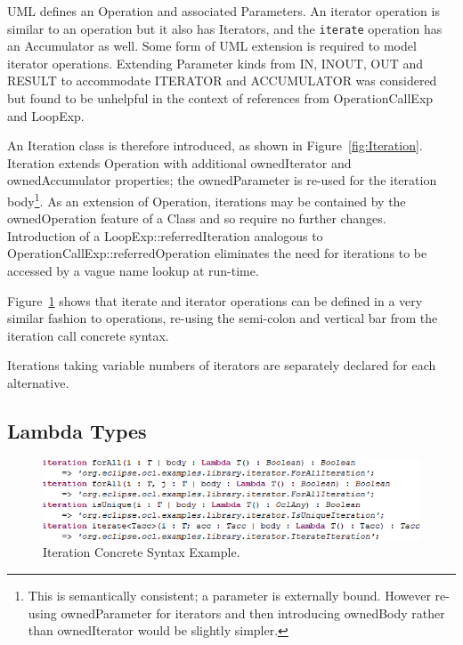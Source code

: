 \documentclass{eceasst}
\begin{document}
UML defines an Operation and associated Parameters. An iterator operation is similar to an operation but it also has Iterators, and the \verb|iterate| operation has an Accumulator as well. Some form of UML extension is required to model iterator operations. Extending Parameter kinds from  IN, INOUT, OUT and RESULT to accommodate ITERATOR and ACCUMULATOR was considered but found to be unhelpful in the context of references from OperationCallExp and LoopExp.

An Iteration class is therefore introduced, as shown in Figure~\ref{fig:Iteration}. Iteration extends Operation with additional ownedIterator and ownedAccumulator properties; the ownedParameter is re-used for the iteration body\footnote{This is semantically consistent; a parameter is externally bound. However re-using ownedParameter for iterators and then introducing ownedBody rather than ownedIterator would be slightly simpler.}. As an extension of Operation, iterations may be contained by the ownedOperation feature of a Class and so require no further changes. Introduction of a LoopExp::referredIteration analogous to OperationCallExp::referredOperation eliminates the need for iterations to be accessed by a vague name lookup at run-time.

Figure~\ref{fig:IterationExample} shows that iterate and iterator operations can be defined in a very similar fashion to operations, re-using the semi-colon and vertical bar from the iteration call concrete syntax. 

Iterations taking variable numbers of iterators are separately declared for each alternative.

\subsection{Lambda Types}

\begin{figure}
  \begin{center}
    \includegraphics[width=5.75in]{IterationExample.png}
  \end{center}
  \caption{Iteration Concrete Syntax Example.}
  \label{fig:IterationExample}
\end{figure}
\end{document}
